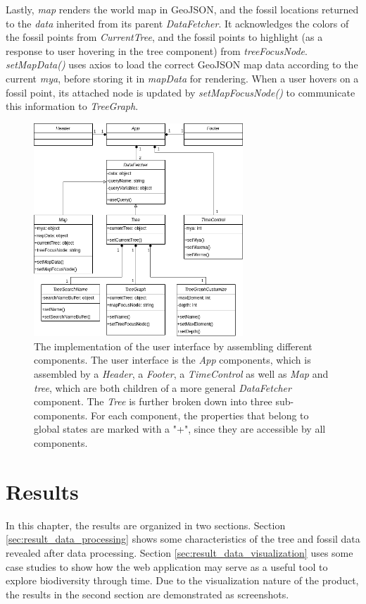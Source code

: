 \documentclass[11pt, a4paper,oneside,chapterprefix=false]{scrbook}
\begin{document}
Lastly, \emph{map} renders the world map in GeoJSON, and the fossil locations returned to the \emph{data} inherited from its parent \emph{DataFetcher}. It acknowledges the colors of the fossil points from \emph{CurrentTree}, and the fossil points to highlight (as a response to user hovering in the tree component) from \emph{treeFocusNode}. \emph{setMapData()} uses axios to load the correct GeoJSON map data according to the current \emph{mya}, before storing it in \emph{mapData} for rendering. When a user hovers on a fossil point, its attached node is updated by \emph{setMapFocusNode()} to communicate this information to \emph{TreeGraph}.

\begin{figure}[h]
	\centering
	\includegraphics[width=0.7\textwidth]{figures/implementation/components}
	\caption{The implementation of the user interface by assembling different components. The user interface is the \emph{App} components, which is assembled by a \emph{Header}, a \emph{Footer}, a \emph{TimeControl} as well as \emph{Map} and \emph{tree}, which are both children of a more general \emph{DataFetcher} component. The \emph{Tree} is further broken down into three sub-components. For each component, the properties that belong to global states are marked with a "+", since they are accessible by all components.}
	\label{fig:components}
\end{figure}
\chapter{Results} \label{chp:results}
In this chapter, the results are organized in two sections. Section \ref{sec:result_data_processing} shows some characteristics of the tree and fossil data revealed after data processing. Section \ref{sec:result_data_visualization} uses some case studies to show how the web application may serve as a useful tool to explore biodiversity through time. Due to the visualization nature of the product, the results in the second section are demonstrated as screenshots.
\end{document}
